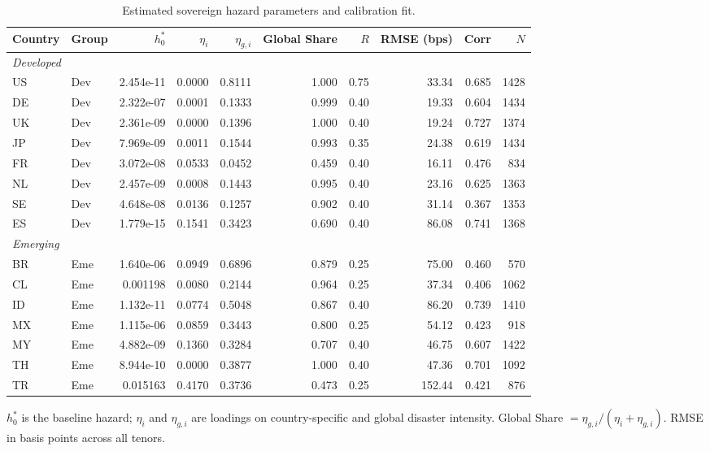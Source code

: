 \begin{table}[H]
\centering
\caption{Estimated sovereign hazard parameters and calibration fit.}
\label{tab:calibration_main}
\begin{tabular}{llrrrrrrrr}
\toprule
Country & Group & $h_0^*$ & $\eta_i$ & $\eta_{g,i}$ & Global Share & $R$ & RMSE (bps) & Corr & $N$ \\
\midrule
\multicolumn{10}{l}{\textit{Developed}} \\
\midrule
US & Dev & 2.454e-11 & 0.0000 & 0.8111 & 1.000 & 0.75 & 33.34 & 0.685 & 1428 \\
DE & Dev & 2.322e-07 & 0.0001 & 0.1333 & 0.999 & 0.40 & 19.33 & 0.604 & 1434 \\
UK & Dev & 2.361e-09 & 0.0000 & 0.1396 & 1.000 & 0.40 & 19.24 & 0.727 & 1374 \\
JP & Dev & 7.969e-09 & 0.0011 & 0.1544 & 0.993 & 0.35 & 24.38 & 0.619 & 1434 \\
FR & Dev & 3.072e-08 & 0.0533 & 0.0452 & 0.459 & 0.40 & 16.11 & 0.476 & 834 \\
NL & Dev & 2.457e-09 & 0.0008 & 0.1443 & 0.995 & 0.40 & 23.16 & 0.625 & 1363 \\
SE & Dev & 4.648e-08 & 0.0136 & 0.1257 & 0.902 & 0.40 & 31.14 & 0.367 & 1353 \\
ES & Dev & 1.779e-15 & 0.1541 & 0.3423 & 0.690 & 0.40 & 86.08 & 0.741 & 1368 \\
\midrule
\multicolumn{10}{l}{\textit{Emerging}} \\
\midrule
BR & Eme & 1.640e-06 & 0.0949 & 0.6896 & 0.879 & 0.25 & 75.00 & 0.460 & 570 \\
CL & Eme & 0.001198 & 0.0080 & 0.2144 & 0.964 & 0.25 & 37.34 & 0.406 & 1062 \\
ID & Eme & 1.132e-11 & 0.0774 & 0.5048 & 0.867 & 0.40 & 86.20 & 0.739 & 1410 \\
MX & Eme & 1.115e-06 & 0.0859 & 0.3443 & 0.800 & 0.25 & 54.12 & 0.423 & 918 \\
MY & Eme & 4.882e-09 & 0.1360 & 0.3284 & 0.707 & 0.40 & 46.75 & 0.607 & 1422 \\
TH & Eme & 8.944e-10 & 0.0000 & 0.3877 & 1.000 & 0.40 & 47.36 & 0.701 & 1092 \\
TR & Eme & 0.015163 & 0.4170 & 0.3736 & 0.473 & 0.25 & 152.44 & 0.421 & 876 \\
\bottomrule
\end{tabular}
\begin{tablenotes}[flushleft]\footnotesize
\item $h_0^*$ is the baseline hazard; $\eta_i$ and $\eta_{g,i}$ are loadings on country-specific and global disaster intensity. Global Share $= \eta_{g,i}/(\eta_i+\eta_{g,i})$. RMSE in basis points across all tenors.
\end{tablenotes}
\end{table}
